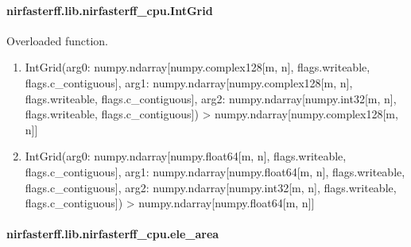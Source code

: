 \documentclass[letterpaper,10pt,english]{sphinxmanual}
\begin{document}
\sphinxstepscope


\paragraph{nirfasterff.lib.nirfasterff\_cpu.IntGrid}
\label{\detokenize{_autosummary/nirfasterff.lib.nirfasterff_cpu.IntGrid:nirfasterff-lib-nirfasterff-cpu-intgrid}}\label{\detokenize{_autosummary/nirfasterff.lib.nirfasterff_cpu.IntGrid::doc}}

\begin{fulllineitems}
\label{\detokenize{_autosummary/nirfasterff.lib.nirfasterff_cpu.IntGrid:nirfasterff.lib.nirfasterff_cpu.IntGrid}}
\pysigstartsignatures
\pysiglinewithargsret
{}
{\sphinxparamcomma {}}
{}
\pysigstopsignatures
\sphinxAtStartPar
Overloaded function.
\begin{enumerate}
%
\item {} 
\sphinxAtStartPar
IntGrid(arg0: numpy.ndarray{[}numpy.complex128{[}m, n{]}, flags.writeable, flags.c\_contiguous{]}, arg1: numpy.ndarray{[}numpy.complex128{[}m, n{]}, flags.writeable, flags.c\_contiguous{]}, arg2: numpy.ndarray{[}numpy.int32{[}m, n{]}, flags.writeable, flags.c\_contiguous{]}) \sphinxhyphen{}\textgreater{} numpy.ndarray{[}numpy.complex128{[}m, n{]}{]}

\item {} 
\sphinxAtStartPar
IntGrid(arg0: numpy.ndarray{[}numpy.float64{[}m, n{]}, flags.writeable, flags.c\_contiguous{]}, arg1: numpy.ndarray{[}numpy.float64{[}m, n{]}, flags.writeable, flags.c\_contiguous{]}, arg2: numpy.ndarray{[}numpy.int32{[}m, n{]}, flags.writeable, flags.c\_contiguous{]}) \sphinxhyphen{}\textgreater{} numpy.ndarray{[}numpy.float64{[}m, n{]}{]}

\end{enumerate}

\end{fulllineitems}


\sphinxstepscope


\paragraph{nirfasterff.lib.nirfasterff\_cpu.ele\_area}
\label{\detokenize{_autosummary/nirfasterff.lib.nirfasterff_cpu.ele_area:nirfasterff-lib-nirfasterff-cpu-ele-area}}\label{\detokenize{_autosummary/nirfasterff.lib.nirfasterff_cpu.ele_area::doc}}
\end{document}
